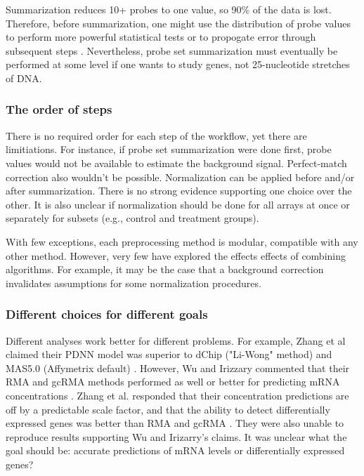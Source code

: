 Summarization reduces 10+ probes to one value, so 90\% of the data
is lost. Therefore, before summarization, one might use
the distribution of probe values to perform more powerful statistical tests or to propogate
error through subsequent steps \cite{Milo:2003tt,Liu:2005ey}.
Nevertheless, probe set summarization must eventually be performed
at some level if one wants to study genes, not 25-nucleotide stretches of DNA.

\subsubsection{The order of steps}
There is no required order for each step of the workflow,
yet there are limitiations. For instance, if probe set summarization were done first,
probe values would not be available to estimate the background signal. 
Perfect-match correction also wouldn't
be possible. Normalization can be applied before and/or after summarization.
There is no strong evidence supporting one choice over the other.
It is also unclear if normalization should be done for all arrays at once
or separately for subsets (e.g., control and treatment groups).

With few exceptions, each preprocessing method is modular, compatible
with any other method. However, very few have explored
the effects effects of combining algorithms.
For example, it may be the case that a background correction
invalidates assumptions for some normalization procedures.

\subsubsection{Different choices for different goals}\label{introjtm:difgoals}

Different analyses work better for different problems.
For example, Zhang et al claimed their PDNN model 
was superior to dChip ("Li-Wong" method)
and MAS5.0 (Affymetrix default) \cite{Zhang:2003to}.
However, Wu and Irizzary commented that their
RMA and gcRMA methods performed as well or better for predicting
mRNA concentrations \cite{Wu:2004ul}.
Zhang et al. responded that their concentration predictions
are off by a predictable scale factor, and that
the ability to detect differentially expressed genes
was better than RMA and gcRMA \cite{Zhang:2004tl}. They were also unable to
reproduce results supporting Wu and Irizarry's claims.
It was unclear what the goal should be: accurate predictions of mRNA levels or
differentially expressed genes?

